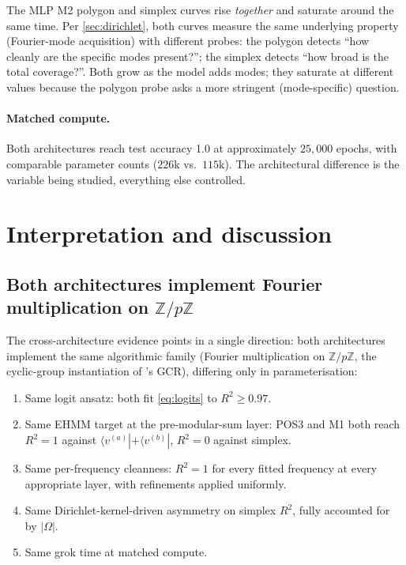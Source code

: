 \documentclass[11pt,a4paper]{article}
\begin{document}
The MLP M2 polygon and simplex curves rise \emph{together} and saturate around the same time. Per \cref{sec:dirichlet}, both curves measure the same underlying property (Fourier-mode acquisition) with different probes: the polygon detects ``how cleanly are the specific modes present?''; the simplex detects ``how broad is the total coverage?''. Both grow as the model adds modes; they saturate at different values because the polygon probe asks a more stringent (mode-specific) question.

\paragraph{Matched compute.} Both architectures reach test accuracy 1.0 at approximately $25{,}000$ epochs, with comparable parameter counts ($226$k vs.\ $115$k). The architectural difference is the variable being studied, everything else controlled.

\section{Interpretation and discussion}\label{sec:discussion}

\subsection{Both architectures implement Fourier multiplication on $\mathbb{Z}/p\mathbb{Z}$}

The cross-architecture evidence points in a single direction: both architectures implement the same algorithmic family (Fourier multiplication on $\mathbb{Z}/p\mathbb{Z}$, the cyclic-group instantiation of \citet{chughtai2023toy}'s GCR), differing only in parameterisation:

\begin{enumerate}
    \item Same logit ansatz: both fit \eqref{eq:logits} to $R^2 \geq 0.97$.
    \item Same EHMM target at the pre-modular-sum layer: POS3 and M1 both reach $R^2 = 1$ against $\langle v^{(a)} | + \langle v^{(b)} |$, $R^2 = 0$ against simplex.
    \item Same per-frequency cleanness: $R^2 = 1$ for every fitted frequency at every appropriate layer, with refinements applied uniformly.
    \item Same Dirichlet-kernel-driven asymmetry on simplex $R^2$, fully accounted for by $|\Omega|$.
    \item Same grok time at matched compute.
\end{enumerate}
\end{document}
